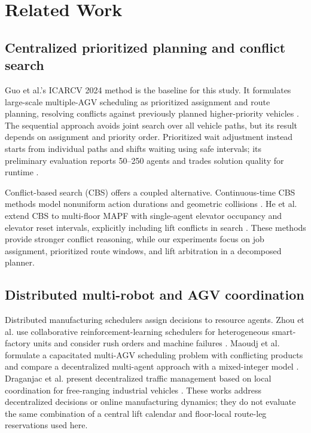 \section{Related Work}
\label{sec:related}

\subsection{Centralized prioritized planning and conflict search}

Guo et al.'s ICARCV 2024 method is the baseline for this study. It formulates
large-scale multiple-AGV scheduling as prioritized assignment and route
planning, resolving conflicts against previously planned higher-priority
vehicles \cite{guo2024}. The sequential approach avoids joint search over all
vehicle paths, but its result depends on assignment and priority order.
Prioritized wait adjustment instead starts from individual paths and shifts
waiting using safe intervals; its preliminary evaluation reports 50--250
agents and trades solution quality for runtime \cite{andreychuk2018}.

Conflict-based search (CBS) offers a coupled alternative. Continuous-time CBS
methods model nonuniform action durations and geometric collisions
\cite{andreychuk2022}. He et al. extend CBS to multi-floor MAPF with
single-agent elevator occupancy and elevator reset intervals, explicitly
including lift conflicts in search \cite{he2026}. These methods provide
stronger conflict reasoning, while our experiments focus on job assignment,
prioritized route windows, and lift arbitration in a decomposed planner.

\subsection{Distributed multi-robot and AGV coordination}

Distributed manufacturing schedulers assign decisions to resource agents.
Zhou et al. use collaborative reinforcement-learning schedulers for
heterogeneous smart-factory units and consider rush orders and machine
failures \cite{zhou2021}. Maoudj et al. formulate a capacitated multi-AGV
scheduling problem with conflicting products and compare a decentralized
multi-agent approach with a mixed-integer model \cite{maoudj2023}. Draganjac
et al. present decentralized traffic management based on local coordination
for free-ranging industrial vehicles \cite{draganjac2020}. These works
address decentralized decisions or online manufacturing dynamics; they do
not evaluate the same combination of a central lift calendar and floor-local
route-leg reservations used here.

